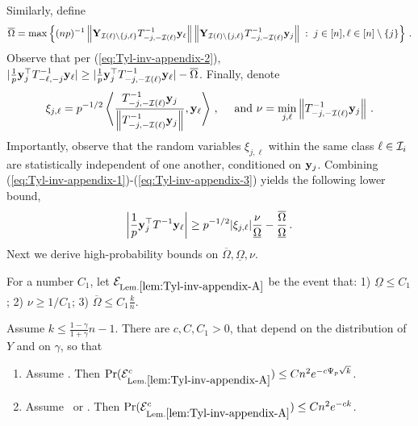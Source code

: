 \documentclass[times,sort&compress,3p]{elsarticle}
\begin{document}
Similarly, define
\begin{equation}\label{eq:Tyl-Omegas-2}
    \overline{\Omega} = \max \left\{ (np)^{-1}\left\| {\bf Y}_{\mathcal{I}(\ell)\setminus\{j,\ell\}}T_{-j,-\mathcal{I}(\ell)}^{-1}{\bf y}_\ell \right\|\left\| {\bf Y}_{\mathcal{I}(\ell)\setminus\{j,\ell\}}T_{-j,-\mathcal{I}(\ell)}^{-1}{\bf y}_j \right\| \;:\;j\in [n],\ell\in [n]\setminus\{j\}\right\}\,.
\end{equation}
Observe that per (\ref{eq:Tyl-inv-appendix-2}), $|\frac{1}{p}{\bf y}_j^\top T_{-\ell,-j}^{-1} {\bf y}_\ell|\ge |\frac{1}{p}{\bf y}_j^\top T_{-j,-\mathcal{I}(\ell)}^{-1} {\bf y}_\ell| - \overline{\Omega}$.
Finally, denote
\begin{equation}\label{eq:Tyl-xi-nu}
    \xi_{j,\ell} = p^{-1/2} \left\langle \frac{T_{-j,-\mathcal{I}(\ell)}^{-1}{\bf y}_j}{\left\|T_{-j,-\mathcal{I}(\ell)}^{-1}{\bf y}_j\right\|}, {\bf y}_\ell \right\rangle\,,\quad\textrm{ and } \nu = \min_{j,\ell} \left\|T_{-j,-\mathcal{I}(\ell)}^{-1}{\bf y}_j\right\| \,.
\end{equation}
Importantly, observe that the random variables $\xi_{j,\ell}$ within the same class $\ell\in \mathcal{I}_i$ are statistically independent of one another, conditioned on ${\bf y}_j$. 
Combining (\ref{eq:Tyl-inv-appendix-1})-(\ref{eq:Tyl-inv-appendix-3}) yields the following lower bound,
\begin{equation}\label{eq:Tyl-inv-appendix-3}
    \left|\frac{1}{p}{\bf y}_j^\top T^{-1}{\bf y}_\ell\right|  \ge p^{-1/2}|\xi_{j,\ell}|\frac{\nu}{\underline{\Omega}} - \frac{\overline{\Omega}}{\underline{\Omega}} \,.
\end{equation}
Next we derive high-probability bounds on $\overline{\Omega},\underline{\Omega},\nu$.
\begin{lemma}\label{lem:Tyl-inv-appendix-A}
    For a number $C_1$, let $\Ec_{\mathrm{Lem.}\ref*{lem:Tyl-inv-appendix-A}}$ be the event that: 1) $\underline{\Omega}\le C_1$; 2) $\nu\ge 1/C_1$; 3) $\overline{\Omega}\le C_1\frac{k}{n}$. 
    
    Assume $k\le \frac{1-\gamma}{1+\gamma}n-1$. There are $c,C,C_1>0$, that depend on the distribution of $Y$ and on $\gamma$, so that 
        \begin{enumerate}
        \item Assume \AssumLC. Then $\Pr(\Ec_{\mathrm{Lem.}\ref*{lem:Tyl-inv-appendix-A}}^c)\le Cn^2e^{-c\Psi_p\sqrt{k}}$.
        \item Assume \AssumIndep~or \AssumCCPSB. Then $\Pr(\Ec_{\mathrm{Lem.}\ref*{lem:Tyl-inv-appendix-A}}^c)\le Cn^2e^{-ck}$.
    \end{enumerate}
\end{lemma}
\end{document}
